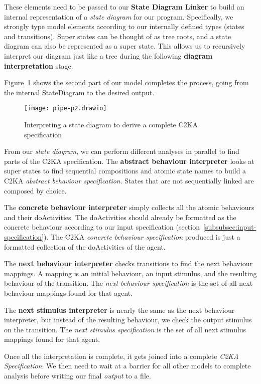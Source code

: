 These elements need to be passed to our \textbf{State Diagram Linker}
to build an internal representation of a \textit{state diagram} for our program.
Specifically, we strongly type model elements according to our internally defined types (states and transitions).
Super states can be thought of as tree roots, and a state diagram can also be represented as a super state.
This allows us to recursively interpret our diagram just like a tree during the following \textbf{diagram interpretation} stage.

Figure~\ref{fig:pipe-2} shows the second part of our model completes the process, going from the internal StateDiagram to the desired output.
\begin{figure}[ht]
    \centering
    \texttt{[image: pipe-p2.drawio]}
    \caption{Interpreting a state diagram to derive a complete C2KA specification}
    \label{fig:pipe-2}
\end{figure}

From our \textit{state diagram}, we can perform different analyses in parallel to find parts of the C2KA specification.
The \textbf{abstract behaviour interpreter} looks at super states to find sequential compositions
and atomic state names to build a C2KA \textit{abstract behaviour specification}.
States that are not sequentially linked are composed by choice.

The \textbf{concrete behaviour interpreter} simply collects all the atomic behaviours and their doActivities.
The doActivities should already be formatted as the concrete behaviour according to our input specification (section~\ref{subsubsec:input-specification}).
The C2KA \textit{concrete behaviour specification} produced is just a formatted collection of the doActivities of the agent.

The \textbf{next behaviour interpreter} checks transitions to find the next behaviour mappings.
A mapping is an initial behaviour, an input stimulus, and the resulting behaviour of the transition.
The \textit{next behaviour specification} is the set of all next behaviour mappings found for that agent.

The \textbf{next stimulus interpreter} is nearly the same as the next behaviour interpreter,
but instead of the resulting behaviour, we check the output stimulus on the transition.
The \textit{next stimulus specification} is the set of all next stimulus mappings found for that agent.

Once all the interpretation is complete, it gets joined into a complete \textit{C2KA Specification}.
We then need to wait at a barrier for all other models to complete analysis before writing our final \textit{output} to a file.

